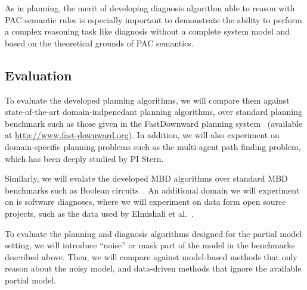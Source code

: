 \documentclass[12pt]{article}
\begin{document}
As in planning, the merit of developing diagnosis algorithm able to reason with PAC semantic rules is especially important to demonstrate the ability to perform a complex reasoning task like diagnosis without a complete system model and based on the theoretical grounds of PAC semantics. 


\subsection{Evaluation}
\label{sec:evaluation}


To evaluate the developed planning algorithms, we will compare them against state-of-the-art domain-indpenedant planning algorithms, over standard planning benchmark such as those given in the FastDownward planning system~\cite{helmert2006fast} (available at \url{http://www.fast-downward.org}). In addition, we will also experiment on domain-specific planning problems such as the multi-agent path finding problem, which has been deeply studied by PI Stern. 

Similarly, we will evalate the developed MBD algorithms over standard MBD benchmarks such as Boolean circuits~\cite{hansen1999unveiling,brglez1999design}. An additional domain we will experiment on is software diagnoses, where we will experiment on data form open source projects, such as the data used by Elmishali et al.~\cite{elmishali2016dataAugmented}. 

To evaluate the planning and diagnosis algorithms designed for the partial model setting, we will introduce ``noise'' or mask part of the model in the benchmarks described above. Then, we will compare against model-based methods that only reason about the noisy model, and data-driven methods that ignore the available partial model. %
\end{document}
